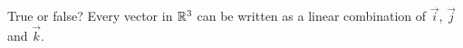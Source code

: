 \documentclass{ximera}
\author{}
\begin{document}
\begin{exercise}
True or false?  Every vector in $\mathbb{R}^3$ can be written as a linear combination of $\vec{i}$, $\vec{j}$ and $\vec{k}$.
\begin{multipleChoice}
 \end{multipleChoice}
\end{exercise}
\end{document}
